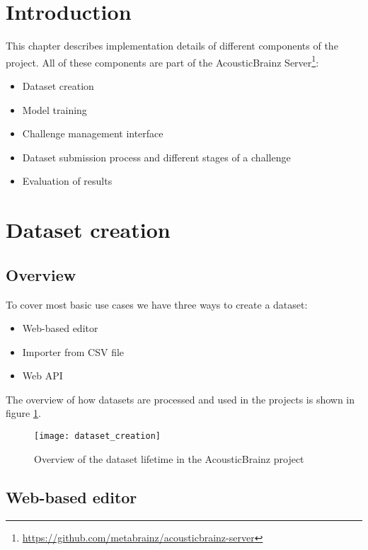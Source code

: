 \section{Introduction}

This chapter describes implementation details of different components of the project. All of these components are part of the AcousticBrainz Server\footnote{\url{https://github.com/metabrainz/acousticbrainz-server}}:
\begin{itemize}
    \item Dataset creation
    \item Model training
    \item Challenge management interface
    \item Dataset submission process and different stages of a challenge
    \item Evaluation of results
\end{itemize}


\section{Dataset creation}

\subsection{Overview}

To cover most basic use cases we have three ways to create a dataset:
\begin{itemize}
    \item Web-based editor
    \item Importer from CSV file
    \item Web API
\end{itemize}

The overview of how datasets are processed and used in the projects is shown in figure \ref{fig:dataset_creation}.

\begin{figure}[h]
  \centering
  \texttt{[image: dataset\_creation]}
    \caption{Overview of the dataset lifetime in the AcousticBrainz project}
    \label{fig:dataset_creation}
\end{figure}

\subsection{Web-based editor}


